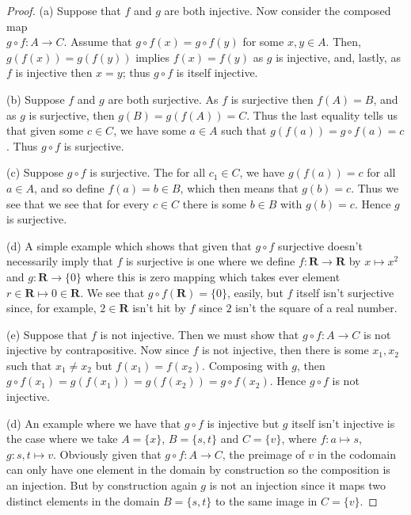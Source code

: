 \documentclass[9pt,reqno]{amsart}
\theoremstyle{definition}
\newcommand{\rr}{\mathbf R}
\begin{document}
\begin{proof}(a) Suppose that $f$ and $g$ are both injective. Now consider the composed map \\ $g \circ f \colon A \to C$. Assume that $ g \circ f (x) = g \circ f(y)$ for some $x, y \in A$. Then, $g(f(x)) = g(f(y))$ implies $f(x) = f(y)$ as $g$ is injective, and, lastly, as $f$ is injective then $x = y$; thus $g \circ f$ is itself injective.  

(b) Suppose $f$ and $g$ are both surjective. As $f$ is surjective then $f(A) = B$, and as $g$ is surjective, then $g(B) = g(f(A)) = C$. Thus the last equality tells us that given some $c \in C$, we have some $a \in A$ such that $g(f(a)) = g\circ f(a) =  c$. Thus $g \circ f$ is surjective. 

(c) Suppose $g \circ f$ is surjective. The for all $ c_1 \in C$, we have $g(f(a)) = c$ for all $a \in A$, and so define $f(a) = b \in B$, which then means that $g(b) = c$. Thus we see that we see that for every $c \in C$ there is some $b \in B$ with $g(b) = c$. Hence $g$ is surjective. 



(d) A simple example which shows that given that $g \circ f$ surjective doesn't necessarily imply that $f$ is surjective is one where we define $f \colon \rr \to \rr$ by $x \mapsto x^2$ and $g \colon \rr \to \{ 0 \}$ where this is zero mapping which takes ever element $r \in \rr \mapsto 0 \in \rr$. We see that $g\circ f(\rr ) =  \{ 0 \}$, easily, but $f$ itself isn't surjective since, for example, $2 \in \rr$ isn't hit by $f$ since $2$ isn't the square of a real number.   

(e) Suppose that $f$ is not injective. Then we must show that $g \circ f \colon A \to C$ is not injective by contrapositive. Now since $f$ is not injective, then there is some $x_1, x_2$ such that $x_1 \neq x_2$ but $f(x_1) = f(x_2)$. Composing with $g$, then $g \circ f(x_1) = g(f(x_1)) = g(f(x_2)) = g\circ f(x_2)$. Hence $ g\circ f$ is not injective. 

(d) An example where we have that $g \circ f$ is injective but $g$ itself isn't injective is the case where we take $A = \{ x\}$, $B = \{ s,t \}$ and $C = \{ v\}$, where $f \colon a \mapsto s$, $g \colon s, t \mapsto v$. Obviously given that $g \circ f \colon A \to C$, the preimage of $v$ in the codomain can only have one element in the domain by construction so the composition is an injection. But by construction again $g$ is not an injection since it maps two distinct elements in the domain $B = \{ s, t \}$ to the same image in $C = \{ v \}$. 
\end{proof}
\end{document}
